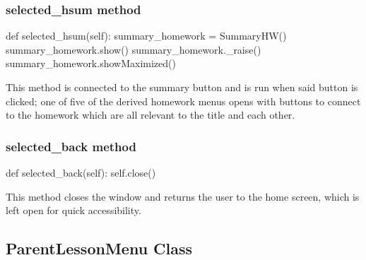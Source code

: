 \subsubsection{selected\_hsum method}

\begin{python}
def selected_hsum(self):
        summary_homework = SummaryHW()
        summary_homework.show()
        summary_homework._raise()
        summary_homework.showMaximized()
\end{python}

This method is connected to the summary button and is run when said button is clicked; one of five of the derived homework menus opens with buttons to connect to the homework which are all relevant to the title and each other.

\subsubsection{selected\_back method}

\begin{python}
def selected_back(self):
        self.close()
\end{python}

This method closes the window and returns the user to the home screen, which is left open for quick accessibility.

\subsection{ParentLessonMenu Class}


